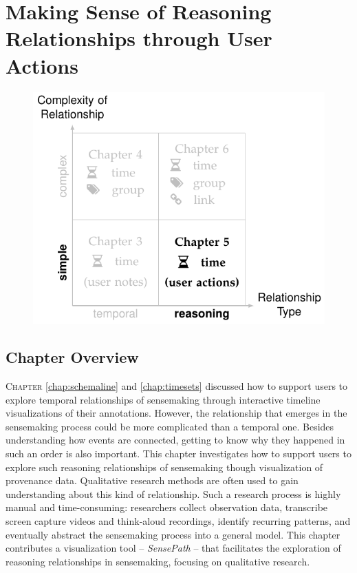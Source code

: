 \chapter{Making Sense of Reasoning Relationships through User Actions}
\label{chap:sensepath}

\graphicspath{{Chapter5/figures/}}

\vspace{.7in}

\begin{figure}[!h]
	\centering
	\includegraphics{work}
\end{figure}

\pagebreak

\section{Chapter Overview}
\lettrine{C}{hapter} \ref{chap:schemaline} and \autoref{chap:timesets} discussed how to support users to explore temporal relationships of sensemaking through interactive timeline visualizations of their annotations. However, the relationship that emerges in the sensemaking process could be more complicated than a temporal one. Besides understanding how events are connected, getting to know why they happened in such an order is also important. This chapter investigates how to support users to explore such reasoning relationships of sensemaking though visualization of provenance data. Qualitative research methods are often used to gain understanding about this kind of relationship. Such a research process is highly manual and time-consuming: researchers collect observation data, transcribe screen capture videos and think-aloud recordings, identify recurring patterns, and eventually abstract the sensemaking process into a general model. This chapter contributes a visualization tool -- \emph{SensePath} -- that facilitates the exploration of reasoning relationships in sensemaking, focusing on qualitative research.

